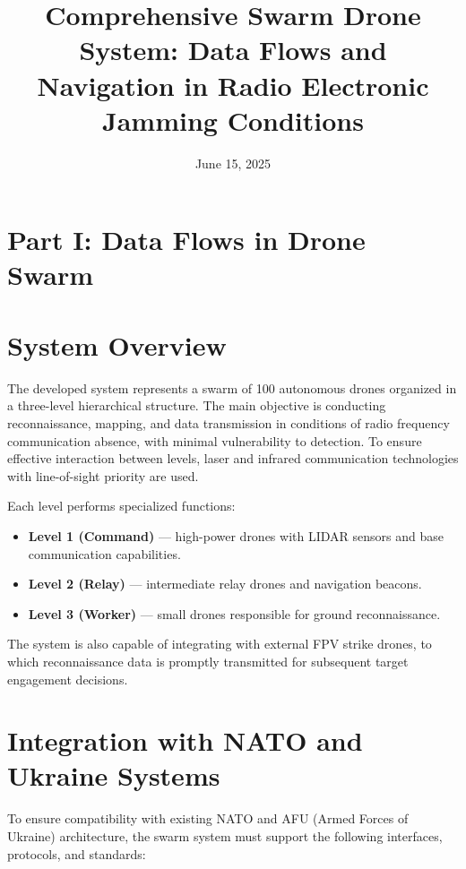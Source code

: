 \documentclass[12pt]{article}
\title{Comprehensive Swarm Drone System: Data Flows and Navigation in Radio Electronic Jamming Conditions}
\author{}
\date{June 15, 2025}
\begin{document}
\maketitle

\tableofcontents
\newpage

\section*{Part I: Data Flows in Drone Swarm}

\section{System Overview}

The developed system represents a swarm of 100 autonomous drones organized in a three-level hierarchical structure. The main objective is conducting reconnaissance, mapping, and data transmission in conditions of radio frequency communication absence, with minimal vulnerability to detection. To ensure effective interaction between levels, laser and infrared communication technologies with line-of-sight priority are used.

Each level performs specialized functions:
\begin{itemize}
    \item \textbf{Level 1 (Command)} --- high-power drones with LIDAR sensors and base communication capabilities.
    \item \textbf{Level 2 (Relay)} --- intermediate relay drones and navigation beacons.
    \item \textbf{Level 3 (Worker)} --- small drones responsible for ground reconnaissance.
\end{itemize}

The system is also capable of integrating with external FPV strike drones, to which reconnaissance data is promptly transmitted for subsequent target engagement decisions.

\section{Integration with NATO and Ukraine Systems}

To ensure compatibility with existing NATO and AFU (Armed Forces of Ukraine) architecture, the swarm system must support the following interfaces, protocols, and standards:
\end{document}
